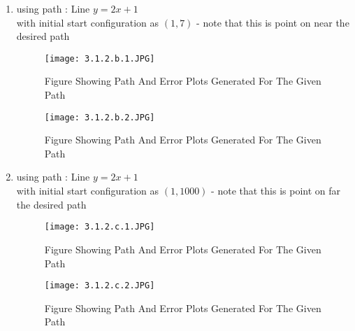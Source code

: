 \documentclass{article}
\begin{document}
\begin{enumerate}
\begin{enumerate}
            \item 
              using path :  Line $ y = 2x + 1$ \\ 
             with initial start configuration as $(1,7)$ - note that this is point on near the desired path
               \renewcommand{\thefigure}{3.1.2.b.1}
                \begin{center}
                    \begin{figure}[H]
                        \centering
                        \texttt{[image: 3.1.2.b.1.JPG]}
                         \caption{Figure Showing Path And Error Plots Generated For The Given Path}
                    \end{figure}
                \end{center}
                 \renewcommand{\thefigure}{3.1.2.b.2}
                \begin{center}
                    \begin{figure}[H]
                        \centering
                        \texttt{[image: 3.1.2.b.2.JPG]}
                         \caption{Figure Showing Path And Error Plots Generated For The Given Path}
                    \end{figure}
                \end{center}
            
            \item 
             using path :  Line $ y = 2x + 1$ \\ 
             with initial start configuration as $(1,1000)$ - note that this is point on far the desired path
               \renewcommand{\thefigure}{3.1.2.c.1}
                \begin{center}
                    \begin{figure}[H]
                        \centering
                        \texttt{[image: 3.1.2.c.1.JPG]}
                         \caption{Figure Showing Path And Error Plots Generated For The Given Path}
                    \end{figure}
                \end{center}
                
                    \renewcommand{\thefigure}{3.1.2.c.2}
                \begin{center}
                    \begin{figure}[H]
                        \centering
                        \texttt{[image: 3.1.2.c.2.JPG]}
                         \caption{Figure Showing Path And Error Plots Generated For The Given Path}
                    \end{figure}
                \end{center}
            

\end{enumerate}
\end{enumerate}
\end{document}
